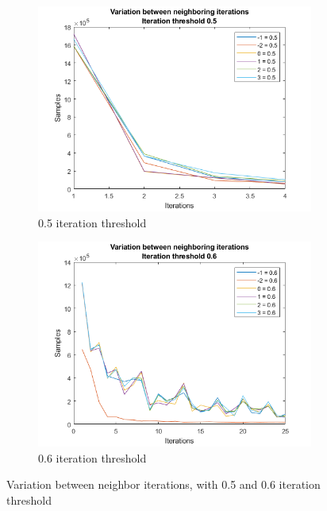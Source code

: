 \begin{figure}
    \centering
    \begin{subfigure}[b]{.45\textwidth}
        \centering
        \includegraphics[width=\textwidth]{figures/varneigh-0.5.png}
        \caption{0.5 iteration threshold}
        \label{sfig:iter:varneigh0.5}
    \end{subfigure}
    \hfill
    \begin{subfigure}[b]{.45\textwidth}
        \centering
        \includegraphics[width=\textwidth]{figures/varneigh-0.6.png}
        \caption{0.6 iteration threshold}
        \label{sfig:iter:varneigh0.6}
    \end{subfigure}
    \caption{Variation between neighbor iterations, with 0.5 and 0.6 iteration threshold}
    \label{fig:iter:varneigh0.50.6}
\end{figure}

